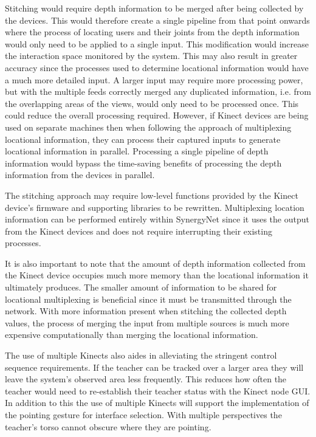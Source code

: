 \documentclass[link]{IWCOMP}
\begin{document}
Stitching would require depth information to be merged after being collected by the devices.
This would therefore create a single pipeline from that point onwards where the process of locating users and their joints from the depth information would only need to be applied to a single input.
This modification would increase the interaction space monitored by the system.
This may also result in greater accuracy since the processes used to determine locational information would have a much more detailed input.
A larger input may require more processing power, but with the multiple feeds correctly merged any duplicated information, i.e. from the overlapping areas of the views, would only need to be processed once.
This could reduce the overall processing required.
However, if Kinect devices are being used on separate machines then when following the approach of multiplexing locational information, they can process their captured inputs to generate locational information in parallel.
Processing a single pipeline of depth information would bypass the time-saving benefits of processing the depth information from the devices in parallel.

The stitching approach may require low-level functions provided by the Kinect device's firmware and supporting libraries to be rewritten.
Multiplexing location information can be performed entirely within SynergyNet since it uses the output from the Kinect devices and does not require interrupting their existing processes.

It is also important to note that the amount of depth information collected from the Kinect device occupies much more memory than the locational information it ultimately produces.
The smaller amount of information to be shared for locational multiplexing is beneficial since it must be transmitted through the network.
With more information present when stitching the collected depth values, the process of merging the input from multiple sources is much more expensive computationally than merging the locational information.

The use of multiple Kinects also aides in alleviating the stringent control sequence requirements.
If the teacher can be tracked over a larger area they will leave the system's observed area less frequently.
This reduces how often the teacher would need to re-establish their teacher status with the Kinect node GUI.
In addition to this the use of multiple Kinects will support the implementation of the pointing gesture for interface selection.
With multiple perspectives the teacher's torso cannot obscure where they are pointing.
\end{document}
